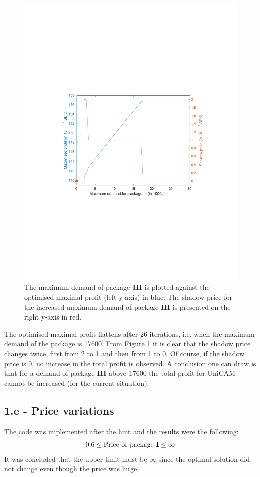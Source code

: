 \documentclass[]{article}
\begin{document}
\begin{figure}[H]
  \centering
  \includegraphics[width=\textwidth]{../task1d.pdf}
  \caption{The maximum demand of package \textbf{III} is plotted against the optimised maximal profit (left y-axis) in blue. The shadow price for the increased maximum demand of package \textbf{III} is presented on the right y-axis in red.}
  \label{fig:task1d}
\end{figure}

The optimised maximal profit flattens after 26 iterations, i.e. when the maximum demand of the package is 17600.
From Figure \ref{fig:task1d} it is clear that the shadow price changes twice, first from 2 to 1 and then from 1 to 0.
Of course, if the shadow price is 0, no increase in the total profit is observed.
A conclusion one can draw is that for a demand of package \textbf{III} above 17600 the total profit for UniCAM cannot be increased (for the current situation).

\subsection*{1.e - Price variations}
The code was implemented after the hint and the results were the following:
\begin{equation*}
  0.6 \leq \text{Price of package \textbf{I}} \leq \infty
  \label{eq:task1e}
\end{equation*}
It was concluded that the upper limit must be $\infty$ since the optimal solution did not change even though the price was huge.
\end{document}
